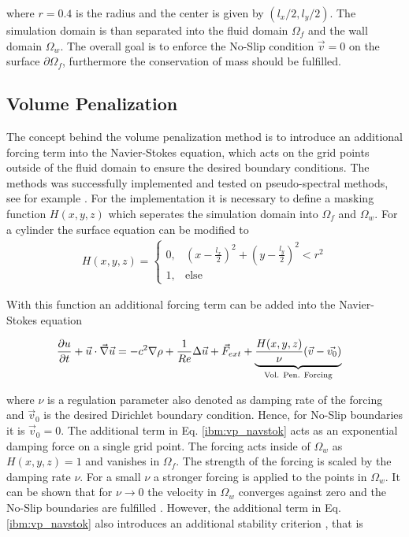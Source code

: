 where $r=0.4$ is the radius and the center is given by $(l_x/2, l_y/2)$.
The simulation domain is than separated into the fluid domain $\Omega_f$ and the wall domain $\Omega_w$.
The overall goal is to enforce the No-Slip condition $\vec{v} = 0$ on the surface $\partial \Omega_f$, furthermore
the conservation of mass should be fulfilled.

\clearpage

\subsection{Volume Penalization}
The concept behind the volume penalization method is to introduce an additional forcing term into the Navier-Stokes equation, which acts on
the grid points outside of the fluid domain to ensure the desired boundary conditions. The methods was successfully implemented and tested
on pseudo-spectral methods, see for example \citep{Lulff2011}.
For the implementation it is necessary to define a masking function $H(x, y, z)$ which seperates the simulation domain into $\Omega_f$ and $\Omega_w$.
For a cylinder the surface equation \label{ibm:eq_cylinder_intro} can be modified to
\begin{align}
    \label{ibm:masking_function}
H(x, y, z) = \begin{cases}
                    0, &  \left(x - \frac{l_x}{2}\right)^2 + \left(y - \frac{l_y}{2}\right)^2 <r^2\\
                    1, & \text{else}
             \end{cases}
\end{align}

With this function an additional forcing term can be added into the Navier-Stokes equation

\begin{align}
    \label{ibm:vp_navstok}
    \pdn[u]{t} + \vec{u} \cdot \vec{\nabla} \vec{u} &= -c^2 \nabla \rho + \frac{1}{Re} \Delta \vec{u} + \vec{F}_{ext}
     +\underbrace{ \frac{H(x, y, z)}{\nu}(\vec{v} - \vec{v_0})}_{\text{Vol. Pen. Forcing}}
\end{align}

where $\nu$ is a regulation parameter also denoted as damping rate of the forcing and $\vec{v}_0$ is the desired Dirichlet boundary condition.
Hence, for No-Slip boundaries it is $\vec{v}_0 = 0 $.
The additional term in Eq. \ref{ibm:vp_navstok} acts as an exponential damping force on a single grid point.
The forcing acts inside of $\Omega_w$ as $H(x, y, z) = 1$ and vanishes in $\Omega_f$.
The strength of the forcing is scaled by the damping rate $\nu$.
For a small $\nu$ a stronger forcing is applied to the points in $\Omega_w$.
It can be shown that for $\nu\rightarrow 0$ the velocity in $\Omega_w$ converges against zero
and the No-Slip boundaries are fulfilled \citep{Lulff2011}.
However, the additional term in Eq. \ref{ibm:vp_navstok}
also introduces an additional stability criterion \citep{Lulff2011}, that is

